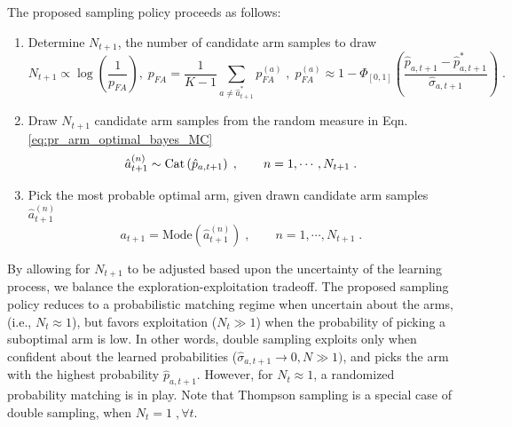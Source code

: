 \documentclass{article}
\newcommand{\ie}{i.e., }
\newcommand{\Cat}{{\rm Cat}}
\begin{document}
The proposed sampling policy proceeds as follows:
\begin{enumerate}
	\item Determine $N_{t+1}$, the number of candidate arm samples to draw
		\begin{equation}
		N_{t+1} \propto \log\left(\frac{1}{p_{FA}}\right), \; p_{FA}=\frac{1}{K-1}\sum_{a \neq \hat{a}_{t+1}^*}p_{FA}^{(a)}\;, \; p_{FA}^{(a)} \approx 1- \Phi_{[0,1]}\left(\frac{\hat{p}_{a,t+1} - \hat{p}^*_{a,{t+1}}}{\hat{\sigma}_{a,t+1}}\right) \; .
		\label{eq:policy_n_samples}
		\end{equation}
	\item Draw $N_{t+1}$ candidate arm samples from the random measure in Eqn. \ref{eq:pr_arm_optimal_bayes_MC}
	\begin{equation}
	\hat{a}_{t+1}^{(n)} \sim \Cat \left(\hat{p}_{a,t+1}\right) \; , \qquad n=1,\cdots, N_{t+1} \; .
	\end{equation}
	\item Pick the most probable optimal arm, given drawn candidate arm samples $\hat{a}_{t+1}^{(n)}$
	\begin{equation}
	a_{t+1} = \text{Mode}\left(\hat{a}_{t+1}^{(n)}\right) \; , \qquad  n=1,\cdots,N_{t+1} \;.
	\end{equation}
\end{enumerate}

By allowing for $N_{t+1}$ to be adjusted based upon the uncertainty of the learning process, we balance the exploration-exploitation tradeoff. The proposed sampling policy reduces to a probabilistic matching regime when uncertain about the arms, (\ie $N_t \approx 1$), but favors exploitation ($N_t \gg 1$) when the probability of picking a suboptimal arm is low. In other words, double sampling exploits only when confident about the learned probabilities ($\hat{\sigma}_{a,t+1} \rightarrow 0, N \gg 1)$, and picks the arm with the highest probability $\hat{p}_{a,t+1}$. However, for $N_t \approx 1$, a randomized probability matching is in play. Note that Thompson sampling is a special case of double sampling, when $N_{t}=1 \;, \forall t$.
\end{document}
